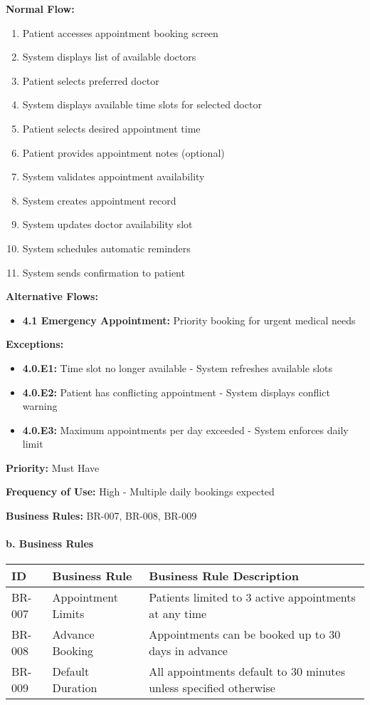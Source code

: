 \documentclass[12pt,a4paper]{article}
\begin{document}
\textbf{Normal Flow:}
\begin{enumerate}
    \item Patient accesses appointment booking screen
    \item System displays list of available doctors
    \item Patient selects preferred doctor
    \item System displays available time slots for selected doctor
    \item Patient selects desired appointment time
    \item Patient provides appointment notes (optional)
    \item System validates appointment availability
    \item System creates appointment record
    \item System updates doctor availability slot
    \item System schedules automatic reminders
    \item System sends confirmation to patient
\end{enumerate}

\textbf{Alternative Flows:}
\begin{itemize}
    \item \textbf{4.1 Emergency Appointment:} Priority booking for urgent medical needs
\end{itemize}

\textbf{Exceptions:}
\begin{itemize}
    \item \textbf{4.0.E1:} Time slot no longer available - System refreshes available slots
    \item \textbf{4.0.E2:} Patient has conflicting appointment - System displays conflict warning
    \item \textbf{4.0.E3:} Maximum appointments per day exceeded - System enforces daily limit
\end{itemize}

\textbf{Priority:} Must Have

\textbf{Frequency of Use:} High - Multiple daily bookings expected

\textbf{Business Rules:} BR-007, BR-008, BR-009

\paragraph{b. Business Rules}

\begin{longtable}{|p{2cm}|p{4cm}|p{8cm}|}
\hline
\textbf{ID} & \textbf{Business Rule} & \textbf{Business Rule Description} \\
\hline
BR-007 & Appointment Limits & Patients limited to 3 active appointments at any time \\
\hline
BR-008 & Advance Booking & Appointments can be booked up to 30 days in advance \\
\hline
BR-009 & Default Duration & All appointments default to 30 minutes unless specified otherwise \\
\hline
\end{longtable}
\end{document}
